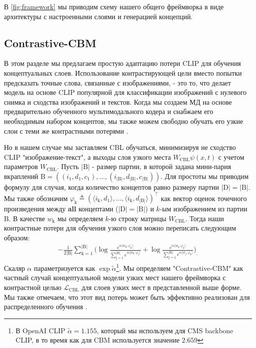 В \cref{fig:framework} мы приводим схему нашего общего фреймворка в виде архитектуры с настроенными слоями и генерацией концепций.

\subsection{Contrastive-CBM}
\label{sec:contrcbm}

В этом разделе мы предлагаем простую адаптацию потери CLIP для обучения концептуальных слоев. Использование контрастирующей цели вместо попытки предсказать точные слова, связанные с изображениями, - это то, что делает модель на основе CLIP популярной для классификации изображений с нулевого снимка и сходства изображений и текстов. Когда мы создаем МД на основе предварительно обученного мультимодального кодера и снабжаем его необходимым набором концептов, мы также можем свободно обучать его узкие слои с теми же контрастными потерями \cite{zhai2023sigmoid}. 

Но в нашем случае мы заставляем CBL обучаться, минимизируя не сходство CLIP "изображение-текст", а выходы слоя узкого места $W_{\mathrm{CBL}}\psi(x, t)$ с учетом параметров $W_{\mathrm{CBL}}$. Пусть $|\mathrm{B}|$ - размер партии, в которой задана мини-пария вкраплений $\mathrm{B} = \left((i_1, d_1, c_1), \dots, (i_{\mathrm{|B|}}, d_{\mathrm{|B|}}, c_{\mathrm{|B|}})\right)$. Для простоты мы приводим формулу для случая, когда количество концептов равно размеру партии $|\mathrm{D}| = |\mathrm{B}|$. Мы также обозначим $\varphi_{\mathrm{k}} \triangleq \left(\langle i_{\mathrm{k}}, d_{\mathrm{1}}\rangle, \dots, \langle i_{\mathrm{k}}, d_{|\mathrm{B}|}\rangle \right)^\top$ как вектор оценок точечного произведения между \textbf{all} концептами ($|\mathrm{D}| = |\mathrm{B}|$) и $k$-ым изображением из партии $\mathrm{B}$. В качестве $w_{\mathrm{k}}$ мы определяем $k$-ю строку матрицы $W_\mathrm{CBL}$. Тогда наши контрастные потери для обучения узкого слоя можно переписать следующим образом:
\begin{align*}\label{eq:contr}
-\frac{1}{2|\mathrm{B}|} \sum_{\mathrm{k}=1}^{|\mathrm{B}|}\Bigg(\log \frac{e^{\alpha \langle w_{\mathrm{k}}, \varphi_{\mathrm{k}}\rangle}}{\sum_{\mathrm{j}=1}^{|\mathrm{B}|}e^{\alpha \langle w_{\mathrm{k}}, \varphi_{\mathrm{j}}\rangle}} + \log \frac{e^{\alpha \langle w_{\mathrm{k}}, \varphi_{\mathrm{k}}\rangle}}{\sum_{\mathrm{j}=1}^{|\mathrm{B}|}e^{\alpha \langle w_{\mathrm{j}}, \varphi_{\mathrm{k}}\rangle}} \Bigg)_.
\end{align*}
Скаляр $\alpha$ параметризуется как $\exp{\tilde{\alpha}}$\footnote{В OpenAI CLIP $\tilde{\alpha} = 1.155$, который мы используем для CMS backbone CLIP, в то время как для CBM используется значение $2.659$}. Мы определяем "Contrastive-CBM" как частный случай концептуальной модели узких мест нашего фреймворка с контрастной целью $\mathcal{L}_{\mathrm{CBL}}$ для слоев узких мест в представленной выше форме. Мы также отмечаем, что этот вид потерь может быть эффективно реализован для распределенного обучения \cite{chen2023discoclip,zhai2023sigmoid}.


